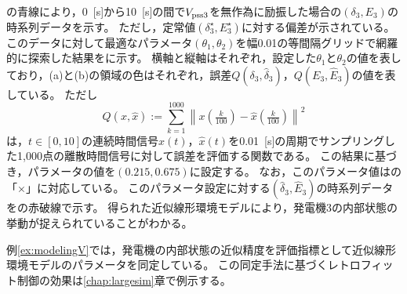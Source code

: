 \documentclass[tombow,dvipdfmx]{corona-a5-1.1}
\begin{document}
\begin{例}[計測データに基づく近似線形環境モデルの同定]
の青線により，0~[s]から10~[s]の間で$V_{{\rm pss}3}$を無作為に励振した場合の$(\delta_3,E_3)$の時系列データを示す。
ただし，定常値$(\delta_3^{\star},E_3^{\star})$に対する偏差が示されている。
このデータに対して最適なパラメータ$(\theta_1,\theta_2)$を幅0.01の等間隔グリッドで網羅的に探索した結果をに示す。
横軸と縦軸はそれぞれ，設定した$\theta_1$と$\theta_2$の値を表しており，(a)と(b)の領域の色はそれぞれ，誤差$Q(\delta_3,\hat{\delta}_3)$，$Q(E_3,\hat{E}_3)$の値を表している。
ただし
\[
Q(x,\hat{x}):=
\sum_{k=1}^{1000}
\left\|
x\left(
\tfrac{k}{100}
\right)
-
\hat{x}\left(
\tfrac{k}{100}
\right)
\right\|^2
\]
は，$t\in [0,10]$の連続時間信号$x(t)$，$\hat{x}(t)$を0.01~[s]の周期でサンプリングした1,000点の離散時間信号に対して誤差を評価する関数である。
この結果に基づき，パラメータの値を$(0.215,0.675)$に設定する。
なお，このパラメータ値はの「$\times$」に対応している。
このパラメータ設定に対する$(\hat{\delta}_3,\hat{E}_3)$の時系列データをの赤破線で示す。
得られた近似線形環境モデルにより，発電機3の内部状態の挙動が捉えられていることがわかる。
\end{例}


例\ref{ex:modelingV}では，発電機の内部状態の近似精度を評価指標として近似線形環境モデルのパラメータを同定している。
この同定手法に基づくレトロフィット制御の効果は\ref{chap:largesim}章で例示する。



\newpage
\end{document}
